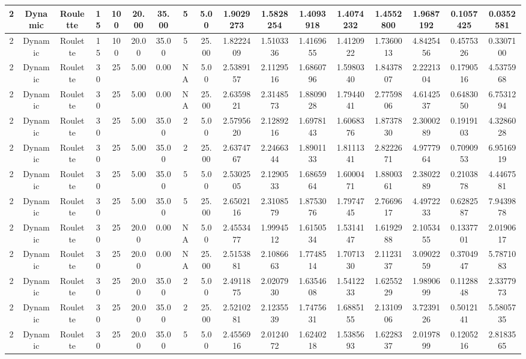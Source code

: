 \documentclass[a4paper]{article}
\begin{document}
\begin{center}
\begin{tabular}{ | c | c | c | c | c | c | c | c | c | c | c | c | c | c | c | c | c | }
		\hline
		2	&	Dynamic	&	Roulette	&	15	&	100	&	20.00	&	35.00	&	5	&	5.00	&	1.9029273	&	1.5828254	&	1.4093918	&	1.4074232	&	1.4552800	&	1.9687192	&	0.1057425	&	0.0352581 \\
		\hline
		2	&	Dynamic	&	Roulette	&	15	&	100	&	20.00	&	35.00	&	5	&	25.00	&	1.8222409	&	1.5103336	&	1.4169655	&	1.4120922	&	1.7360013	&	4.8425456	&	0.4575326	&	0.3307100 \\
		\hline
		2	&	Dynamic	&	Roulette	&	30	&	25	&	5.00	&	0.00	&	NA	&	5.00	&	2.5389157	&	2.1129516	&	1.6860796	&	1.5980340	&	1.8437807	&	2.2221304	&	0.1790516	&	4.5375968 \\
		\hline
		2	&	Dynamic	&	Roulette	&	30	&	25	&	5.00	&	0.00	&	NA	&	25.00	&	2.6359821	&	2.3148573	&	1.8809028	&	1.7944041	&	2.7759806	&	4.6142537	&	0.6483050	&	6.7531294 \\
		\hline
		2	&	Dynamic	&	Roulette	&	30	&	25	&	5.00	&	35.00	&	2	&	5.00	&	2.5795620	&	2.1289216	&	1.6978143	&	1.6068376	&	1.8737830	&	2.3000289	&	0.1919103	&	4.3286028 \\
		\hline
		2	&	Dynamic	&	Roulette	&	30	&	25	&	5.00	&	35.00	&	2	&	25.00	&	2.6374767	&	2.2466344	&	1.8901133	&	1.8111341	&	2.8222671	&	4.9777964	&	0.7090953	&	6.9516919 \\
		\hline
		2	&	Dynamic	&	Roulette	&	30	&	25	&	5.00	&	35.00	&	5	&	5.00	&	2.5302505	&	2.1290533	&	1.6865964	&	1.6000471	&	1.8800361	&	2.3802289	&	0.2103878	&	4.4467581 \\
		\hline
		2	&	Dynamic	&	Roulette	&	30	&	25	&	5.00	&	35.00	&	5	&	25.00	&	2.6502116	&	2.3108579	&	1.8753076	&	1.7974745	&	2.7669617	&	4.4972233	&	0.6282587	&	7.9439878 \\
		\hline
		2	&	Dynamic	&	Roulette	&	30	&	25	&	20.00	&	0.00	&	NA	&	5.00	&	2.4553477	&	1.9994512	&	1.6150534	&	1.5314147	&	1.6192988	&	2.1053455	&	0.1337701	&	2.0190617 \\
		\hline
		2	&	Dynamic	&	Roulette	&	30	&	25	&	20.00	&	0.00	&	NA	&	25.00	&	2.5153881	&	2.1086663	&	1.7748514	&	1.7071330	&	2.1123137	&	3.0902259	&	0.3704947	&	5.7871083 \\
		\hline
		2	&	Dynamic	&	Roulette	&	30	&	25	&	20.00	&	35.00	&	2	&	5.00	&	2.4911875	&	2.0207930	&	1.6354608	&	1.5412233	&	1.6255229	&	1.9890699	&	0.1128848	&	2.3377973 \\
		\hline
		2	&	Dynamic	&	Roulette	&	30	&	25	&	20.00	&	35.00	&	2	&	25.00	&	2.5210281	&	2.1235539	&	1.7475631	&	1.6885155	&	2.1310906	&	3.7239126	&	0.5012141	&	5.5805735 \\
		\hline
		2	&	Dynamic	&	Roulette	&	30	&	25	&	20.00	&	35.00	&	5	&	5.00	&	2.4556916	&	2.0124072	&	1.6240218	&	1.5385693	&	1.6228337	&	2.0197899	&	0.1205216	&	2.8183565 \\

\end{tabular}
\end{center}
\end{document}
